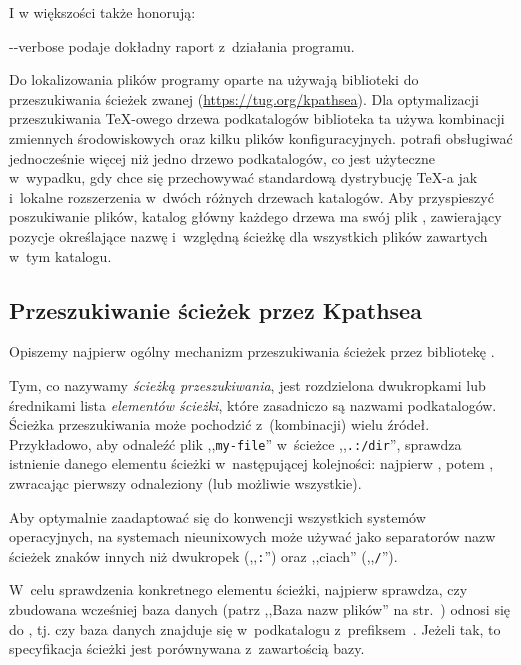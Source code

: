 \documentclass{article}
\renewcommand{\samp}[1]{,,\texttt{#1}''}  %
\begin{document}
I w większości także honorują:
\begin{ttdescription}
\item[-{}-verbose] podaje dokładny raport z~działania programu.
\end{ttdescription}



Do lokalizowania plików programy oparte na \Webc{} używają biblioteki do
przeszukiwania ścieżek zwanej \KPS{} (\url{https://tug.org/kpathsea}).
Dla optymalizacji przeszukiwania \TeX-owego drzewa podkatalogów biblioteka ta
używa kombinacji zmiennych środowiskowych oraz kilku plików konfiguracyjnych.
\Webc{} potrafi obsługiwać jednocześnie więcej niż jedno drzewo
podkatalogów, co jest użyteczne w~wypadku, gdy chce się  przechowywać
standardową dystrybucję \TeX-a jak i~lokalne rozszerzenia w~dwóch różnych
drzewach katalogów.
Aby przyspieszyć  poszukiwanie plików, katalog główny każdego drzewa ma swój
plik , zawierający pozycje określające nazwę i~względną ścieżkę
dla wszystkich plików zawartych w~tym katalogu.


\subsection{Przeszukiwanie ścieżek przez Kpathsea}
\label{sec:kpathsea}

Opiszemy najpierw ogólny mechanizm przeszukiwania ścieżek przez bibliotekę
\KPS{}.

Tym, co nazywamy \emph{ścieżką przeszukiwania}, jest rozdzielona dwukropkami
lub średnikami lista \emph{elementów ścieżki}, które zasadniczo są nazwami
podkatalogów.  Ścieżka przeszukiwania może pochodzić z~(kombinacji) wielu
źródeł.  Przykładowo, aby odnaleźć plik \samp{my-file} w~ścieżce
\samp{.:/dir}, \KPS{} sprawdza istnienie danego elementu ścieżki
w~następującej kolejności: najpierw , potem
, zwracając pierwszy odnaleziony (lub możliwie wszystkie).

Aby optymalnie zaadaptować się  do konwencji wszystkich systemów operacyjnych,
na systemach nieunixowych \KPS{} może używać
jako separatorów nazw ścieżek znaków innych
niż dwukropek (\samp{:}) oraz ,,ciach'' (\samp{/}).

W~celu sprawdzenia konkretnego elementu  ścieżki, \KPS{} najpierw
sprawdza, czy zbudowana wcześniej baza danych (patrz ,,Baza nazw plików'' na
str.~\pageref{sec:filename-database}) odnosi się  do , tj.
czy baza danych znajduje się  w~podkatalogu z~prefiksem~.
Jeżeli tak, to specyfikacja ścieżki jest porównywana z~zawartością bazy.
\end{document}
